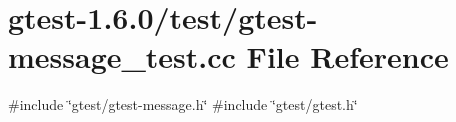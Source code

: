 \hypertarget{gtest-message__test_8cc}{\section{gtest-\/1.6.0/test/gtest-\/message\-\_\-test.cc \-File \-Reference}
\label{d9/df7/gtest-message__test_8cc}
}
{\ttfamily \#include \char`\"{}gtest/gtest-\/message.\-h\char`\"{}}\*
{\ttfamily \#include \char`\"{}gtest/gtest.\-h\char`\"{}}\*
